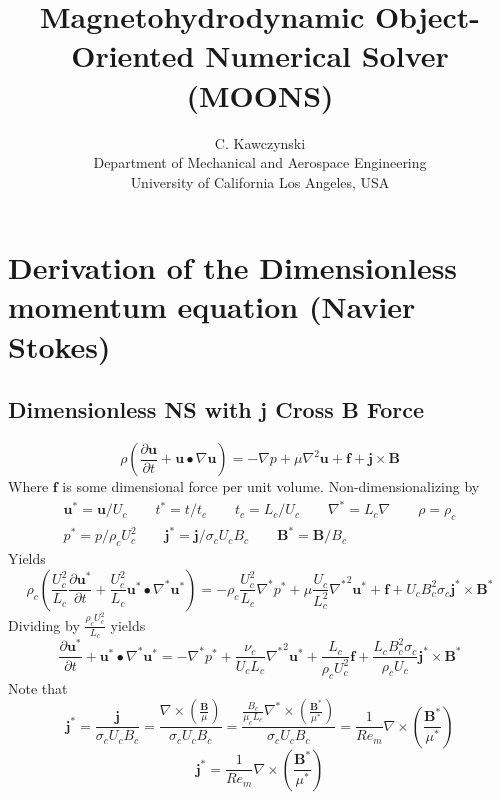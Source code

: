 \documentclass[11pt]{article}
\newcommand{\B}{\mathbf{B}}
\newcommand{\U}{\mathbf{u}}
\newcommand{\PD}{\partial}
\newcommand{\J}{\mathbf{j}}
\newcommand{\F}{\mathbf{f}}
\begin{document}
\doublespacing
\title{Magnetohydrodynamic Object-Oriented Numerical Solver (MOONS)}
\author{C. Kawczynski \\
Department of Mechanical and Aerospace Engineering \\
University of California Los Angeles, USA\\
}
\maketitle

\section{Derivation of the Dimensionless momentum equation (Navier Stokes)}
\subsection{Dimensionless NS with j Cross B Force}
\begin{equation}
	\rho \left( \frac{\PD \U}{\PD t} + \U \bullet \nabla \U \right) = 
	-\nabla p + \mu \nabla^2 \U + \F + \J \times \B
\end{equation}
Where $\F$ is some dimensional force per unit volume. Non-dimensionalizing by
\begin{equation}\begin{aligned}
	\U^* = \U/U_c \qquad
	t^* = t/t_c \qquad
	t_c = L_c/U_c \qquad
	\nabla^* = L_c \nabla \qquad
	\rho = \rho_c \\
	p^* = p/\rho_c U_c^2 \qquad
	\J^* = \J/ \sigma_c U_c B_c \qquad
	\B^* = \B/B_c
\end{aligned}\end{equation}
Yields
\begin{equation}
	\rho_c \left( \frac{U_c^2}{L_c} \frac{\PD \U^*}{\PD t} + \frac{U_c^2}{L_c} \U^* \bullet \nabla^* \U^* \right) = 
	- \rho_c \frac{U_c^2}{L_c} \nabla^*  p^* + \mu \frac{U_c}{L_c^2} {\nabla^*}^2 \U^* + \F +
	U_c B_c^2 \sigma_c \J^* \times \B^*
\end{equation}
Dividing by $\frac{\rho_c U_c^2}{L_c}$ yields
\begin{equation}
	\frac{\PD \U^*}{\PD t} + \U^* \bullet \nabla^* \U^* = 
	- \nabla^*  p^* + 
	\frac{\nu_c}{U_c L_c} {\nabla^*}^2 \U^* + \frac{L_c}{\rho_c U_c^2} \F + 
	\frac{L_c B_c^2 \sigma_c}{\rho_c U_c} \J^* \times \B^*
\end{equation}
Note that
\begin{equation}
	\J^* =
	\frac{\J}{\sigma_c U_c B_c} =
	\frac{\nabla \times \left( \frac{\B}{\mu} \right)}{\sigma_c U_c B_c} =
	\frac{ \frac{B_c}{\mu_c L_c} \nabla^* \times \left( \frac{\B^*}{\mu^*} \right)}{\sigma_c U_c B_c} =
	\frac{1}{Re_m} \nabla \times \left( \frac{\B^*}{\mu^*} \right)
\end{equation}
\begin{equation}
\boxed{ \J^* = \frac{1}{Re_m} \nabla \times \left( \frac{\B^*}{\mu^*} \right) }
\end{equation}
\end{document}
